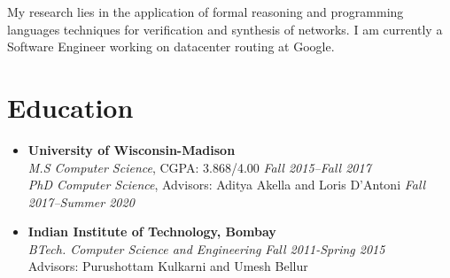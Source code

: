 \documentclass[11pt,a4paper,sans]{moderncv}        %
\begin{document}
\makecvtitle

\small{My research lies in the application of formal reasoning and programming languages techniques for verification and synthesis of networks. I am currently a Software Engineer working on datacenter routing at Google.}

\section{Education}

\vspace{5pt}

\begin{itemize}

\item \textbf{University of Wisconsin-Madison} \\
\emph{M.S Computer Science}, CGPA: 3.868/4.00  \hfill \emph{Fall 2015--Fall 2017} \\
\emph{PhD Computer Science}, Advisors: Aditya Akella and Loris D'Antoni   \hfill \emph{Fall 2017--Summer 2020} \\

\item \textbf{Indian Institute of Technology, Bombay} \\
\emph{BTech. Computer Science and Engineering} \hfill \emph{Fall 2011-Spring 2015} \\
Advisors: Purushottam Kulkarni and Umesh Bellur

\end{itemize}
\end{document}
